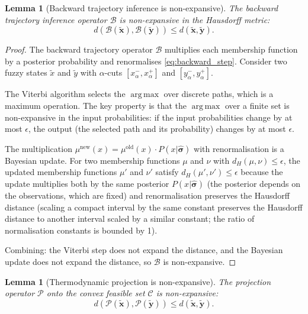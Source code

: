 \documentclass[twocolumn,10pt,a4paper]{article}
\newtheorem{lemma}[theorem]{Lemma}
\theoremstyle{definition}
\theoremstyle{remark}
\newcommand{\Pcal}{\mathcal{P}}
\newcommand{\vect}[1]{\boldsymbol{#1}}
\newcommand{\fuzzy}[1]{\widetilde{#1}}
\DeclareMathOperator*{\argmax}{arg\,max}
\begin{document}
\begin{lemma}[Backward trajectory inference is non-expansive]\label{lem:backward_nonexpansive}
The backward trajectory inference operator $\mathcal{B}$ is non-expansive in the Hausdorff metric:
\begin{equation}\label{eq:backward_nonexpansive}
d(\mathcal{B}(\fuzzy{\vect{x}}), \mathcal{B}(\fuzzy{\vect{y}})) \leq d(\fuzzy{\vect{x}}, \fuzzy{\vect{y}}).
\end{equation}
\end{lemma}

\begin{proof}
The backward trajectory operator $\mathcal{B}$ multiplies each membership function by a posterior probability and renormalises \eqref{eq:backward_step}. Consider two fuzzy states $\fuzzy{x}$ and $\fuzzy{y}$ with $\alpha$-cuts $[x_\alpha^-, x_\alpha^+]$ and $[y_\alpha^-, y_\alpha^+]$.

The Viterbi algorithm selects the $\argmax$ over discrete paths, which is a maximum operation. The key property is that the $\argmax$ over a finite set is non-expansive in the input probabilities: if the input probabilities change by at most $\epsilon$, the output (the selected path and its probability) changes by at most $\epsilon$.

The multiplication $\mu^{\mathrm{new}}(x) = \mu^{\mathrm{old}}(x) \cdot P(x|\hat{\vect{\sigma}})$ with renormalisation is a Bayesian update. For two membership functions $\mu$ and $\nu$ with $d_H(\mu, \nu) \leq \epsilon$, the updated membership functions $\mu'$ and $\nu'$ satisfy $d_H(\mu', \nu') \leq \epsilon$ because the update multiplies both by the same posterior $P(x|\hat{\vect{\sigma}})$ (the posterior depends on the observations, which are fixed) and renormalisation preserves the Hausdorff distance (scaling a compact interval by the same constant preserves the Hausdorff distance to another interval scaled by a similar constant; the ratio of normalisation constants is bounded by 1).

Combining: the Viterbi step does not expand the distance, and the Bayesian update does not expand the distance, so $\mathcal{B}$ is non-expansive.
\end{proof}

\begin{lemma}[Thermodynamic projection is non-expansive]\label{lem:projection_nonexpansive}
The projection operator $\Pcal$ onto the convex feasible set $\mathcal{C}$ is non-expansive:
\begin{equation}\label{eq:projection_nonexpansive}
d(\Pcal(\fuzzy{\vect{x}}), \Pcal(\fuzzy{\vect{y}})) \leq d(\fuzzy{\vect{x}}, \fuzzy{\vect{y}}).
\end{equation}
\end{lemma}
\end{document}
